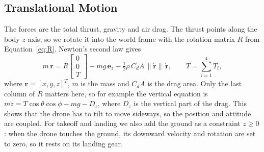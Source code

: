 \documentclass[11pt]{article}
\begin{document}
\subsection{Translational Motion}
The forces are the total thrust, gravity and air drag. The thrust points along the body $z$ axis, so we rotate it into the world frame with the rotation matrix $R$ from Equation~\eqref{eq:R}. Newton's second law gives
\begin{equation}
m\,\ddot{\mathbf{r}} = R\begin{bmatrix}0\\0\\ T\end{bmatrix} - m g\,\mathbf{e}_z - \tfrac{1}{2}\rho\, C_dA\,\lVert\dot{\mathbf{r}}\rVert\,\dot{\mathbf{r}},
\qquad T = \sum_{i=1}^{4} T_i,
\label{eq:trans}
\end{equation}
where $\mathbf{r} = [x,y,z]^T$, $m$ is the mass and $C_dA$ is the drag area. Only the last column of $R$ matters here, so for example the vertical equation is $m\ddot z = T\cos\theta\cos\phi - mg - D_z$, where $D_z$ is the vertical part of the drag. This shows that the drone has to tilt to move sideways, so the position and attitude are coupled. For takeoff and landing we also add the ground as a constraint $z \geq 0$: when the drone touches the ground, its downward velocity and rotation are set to zero, so it rests on its landing gear.
\end{document}
